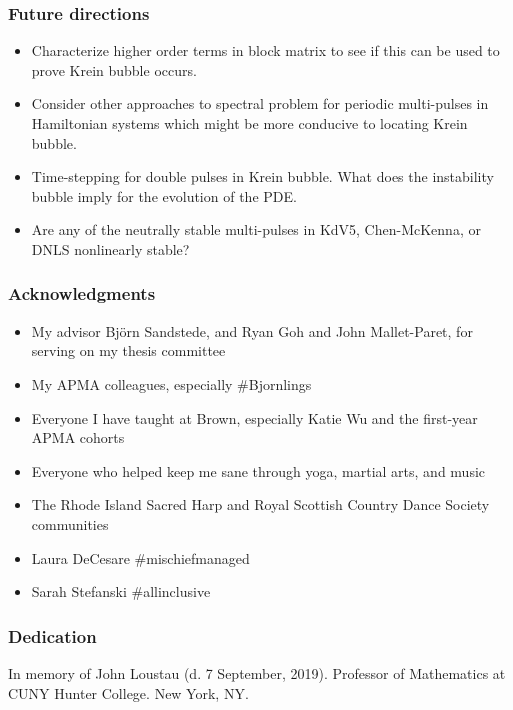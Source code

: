 \documentclass[16pt]{beamer}
\begin{document}
\begin{frame}
	\frametitle{Future directions}
	\fontsize{16}{7.2}\selectfont
	\begin{itemize}
		\item Characterize higher order terms in block matrix to see if this can be used to prove Krein bubble occurs.
		\vspace{0.5cm}
		\item Consider other approaches to spectral problem for periodic multi-pulses in Hamiltonian systems which might be more conducive to locating Krein bubble.
		\vspace{0.5cm}
		\item Time-stepping for double pulses in Krein bubble. What does the instability bubble imply for the evolution of the PDE.
		\vspace{0.5cm}
		\item Are any of the neutrally stable multi-pulses in KdV5, Chen-McKenna, or DNLS nonlinearly stable?
	\end{itemize}
\end{frame}

\begin{frame}
	\frametitle{Acknowledgments}
	\fontsize{14}{7.2}\selectfont
	\begin{itemize}
\item My advisor Bj\"{o}rn Sandstede, and Ryan Goh and John Mallet-Paret, for serving on my thesis committee
\vspace{0.25cm}
\item My APMA colleagues, especially \#Bjornlings
\vspace{0.25cm}
\item Everyone I have taught at Brown, especially Katie Wu and the first-year APMA cohorts
\vspace{0.25cm}
\item Everyone who helped keep me sane through yoga, martial arts, and music
\vspace{0.25cm}
\item The Rhode Island Sacred Harp and Royal Scottish Country Dance Society communities
\vspace{0.25cm}
\item Laura DeCesare \#mischiefmanaged
\vspace{0.25cm}
\item Sarah Stefanski \#allinclusive
	\end{itemize}
\end{frame}

\begin{frame}
	\frametitle{Dedication}
	\fontsize{16}{7.2}\selectfont
	\begin{center}
	In memory of John Loustau (d. 7 September, 2019). Professor of Mathematics at CUNY Hunter College. New York, NY.
	\end{center}
\end{frame}
\end{document}

